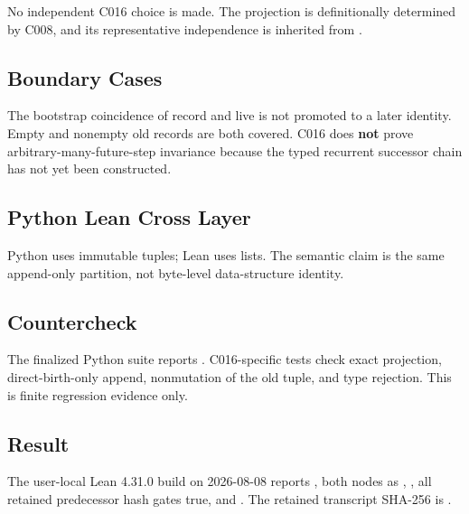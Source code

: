 No independent C016 choice is made. The projection is definitionally
determined by C008, and its representative independence is inherited
from \texttt{\protect{}}.

\subsection{Boundary Cases}\label{boundary-cases-11}

The bootstrap coincidence of record and live is not promoted to a later
identity. Empty and nonempty old records are both covered. C016 does
\textbf{not} prove arbitrary-many-future-step invariance because the
typed recurrent successor chain has not yet been constructed.

\subsection{Python Lean Cross Layer}\label{python-lean-cross-layer-11}

Python uses immutable tuples; Lean uses lists. The semantic claim is the
same append-only partition, not byte-level data-structure identity.

\subsection{Countercheck}\label{countercheck-11}

The finalized Python suite reports
\texttt{\protect{}}. C016-specific tests check
exact projection, direct-birth-only append, nonmutation of the old
tuple, and type rejection. This is finite regression evidence only.

\subsection{Result}\label{result-27}

The user-local Lean 4.31.0 build on 2026-08-08 reports
\texttt{\protect{}}, both nodes as
\texttt{\protect{}},
\texttt{\protect{}}, all retained
predecessor hash gates true, and
\texttt{\protect{}}. The retained transcript
SHA-256 is
\texttt{\protect{}}.

